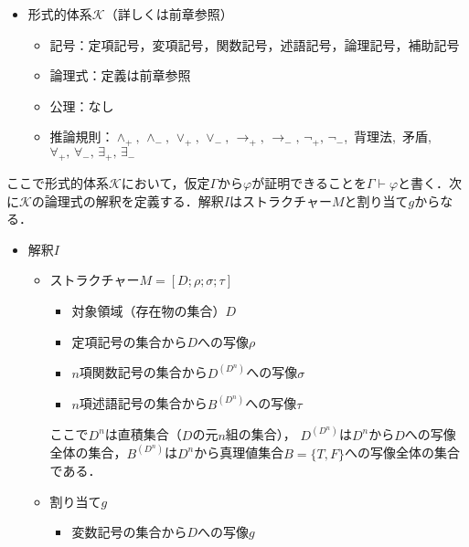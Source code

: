 \documentclass[10pt,b5paper,papersize,dvipdfmx]{jsbook}
\begin{document}
    \begin{itemize}
      \item 形式的体系$\mathcal K$（詳しくは前章参照）
        \begin{itemize}
          \item 記号：定項記号，変項記号，関数記号，述語記号，論理記号，補助記号
          \item 論理式：定義は前章参照
          \item 公理：なし
          \item 推論規則：$\land_+,\, \land_-,\, \lor_+,\, \lor_-,\, \to_+,\, \to_-,\, \lnot_+,\, \lnot_-$,\, 背理法,\, 矛盾,\, $\forall_+,\, \forall_-,\, \exists_+,\, \exists_-$
        \end{itemize}
    \end{itemize}
    ここで形式的体系$\mathcal K$において，仮定$\Gamma$から$\varphi$が証明できることを$\Gamma \vdash \varphi$と書く．次に$\mathcal K$の論理式の解釈を定義する．解釈$I$はストラクチャー$M$と割り当て$g$からなる．
    \begin{itemize}
      \item 解釈$I$
    \begin{itemize}
    \item ストラクチャー$M=[D;\rho;\sigma;\tau]$
      \begin{itemize}
        \item 対象領域（存在物の集合）$D$
        \item 定項記号の集合から$D$への写像$\rho$
        \item $n$項関数記号の集合から$D^{(D^n)}$への写像$\sigma$
        \item $n$項述語記号の集合から$B^{(D^n)}$への写像$\tau$
      \end{itemize}
      ここで$D^n$は直積集合（$D$の元$n$組の集合）， $D^{(D^n)}$は$D^n$から$D$への写像全体の集合，$B^{(D^n)}$は$D^n$から真理値集合$B=\{T,F\}$への写像全体の集合である．
    \item 割り当て$g$
      \begin{itemize}
        \item 変数記号の集合から$D$への写像$g$
      \end{itemize}
  \end{itemize}
\end{itemize}
\end{document}
